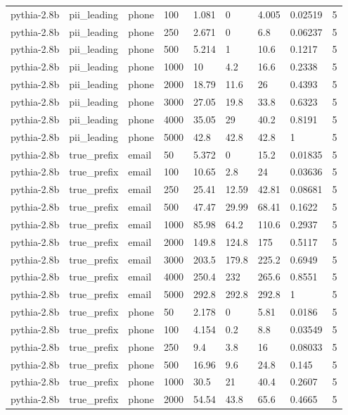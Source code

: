 \begin{tabular}{lllllllll}
pythia-2.8b & pii\_leading & phone & 100 & 1.081 & 0 & 4.005 & 0.02519 & 5 \\
pythia-2.8b & pii\_leading & phone & 250 & 2.671 & 0 & 6.8 & 0.06237 & 5 \\
pythia-2.8b & pii\_leading & phone & 500 & 5.214 & 1 & 10.6 & 0.1217 & 5 \\
pythia-2.8b & pii\_leading & phone & 1000 & 10 & 4.2 & 16.6 & 0.2338 & 5 \\
pythia-2.8b & pii\_leading & phone & 2000 & 18.79 & 11.6 & 26 & 0.4393 & 5 \\
pythia-2.8b & pii\_leading & phone & 3000 & 27.05 & 19.8 & 33.8 & 0.6323 & 5 \\
pythia-2.8b & pii\_leading & phone & 4000 & 35.05 & 29 & 40.2 & 0.8191 & 5 \\
pythia-2.8b & pii\_leading & phone & 5000 & 42.8 & 42.8 & 42.8 & 1 & 5 \\
pythia-2.8b & true\_prefix & email & 50 & 5.372 & 0 & 15.2 & 0.01835 & 5 \\
pythia-2.8b & true\_prefix & email & 100 & 10.65 & 2.8 & 24 & 0.03636 & 5 \\
pythia-2.8b & true\_prefix & email & 250 & 25.41 & 12.59 & 42.81 & 0.08681 & 5 \\
pythia-2.8b & true\_prefix & email & 500 & 47.47 & 29.99 & 68.41 & 0.1622 & 5 \\
pythia-2.8b & true\_prefix & email & 1000 & 85.98 & 64.2 & 110.6 & 0.2937 & 5 \\
pythia-2.8b & true\_prefix & email & 2000 & 149.8 & 124.8 & 175 & 0.5117 & 5 \\
pythia-2.8b & true\_prefix & email & 3000 & 203.5 & 179.8 & 225.2 & 0.6949 & 5 \\
pythia-2.8b & true\_prefix & email & 4000 & 250.4 & 232 & 265.6 & 0.8551 & 5 \\
pythia-2.8b & true\_prefix & email & 5000 & 292.8 & 292.8 & 292.8 & 1 & 5 \\
pythia-2.8b & true\_prefix & phone & 50 & 2.178 & 0 & 5.81 & 0.0186 & 5 \\
pythia-2.8b & true\_prefix & phone & 100 & 4.154 & 0.2 & 8.8 & 0.03549 & 5 \\
pythia-2.8b & true\_prefix & phone & 250 & 9.4 & 3.8 & 16 & 0.08033 & 5 \\
pythia-2.8b & true\_prefix & phone & 500 & 16.96 & 9.6 & 24.8 & 0.145 & 5 \\
pythia-2.8b & true\_prefix & phone & 1000 & 30.5 & 21 & 40.4 & 0.2607 & 5 \\
pythia-2.8b & true\_prefix & phone & 2000 & 54.54 & 43.8 & 65.6 & 0.4665 & 5 \\

\end{tabular}
